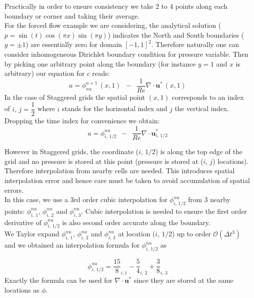 Practically in order to ensure consistency we take 2 to 4 points along each boundary or corner and taking their average. \\

For the forced flow example we are considering, the analytical solution ($p = \sin(t)\cos(\pi x)\sin(\pi y)$) indicates the North and South boundaries ($y=\pm 1$) are essentially zero for domain $[-1,1]^2$. Therefore naturally one can consider inhomogeneous Dirichlet boundary condition for pressure variable. Then by picking one arbitrary point along the boundary (for instance $y=1$ and $x$ is arbitrary) our equation for $c$ reads:
\begin{equation*}
a = \phi^{n+1}_{nu}\,(x,1) \,\,\,-\,\,\, \dfrac{1}{Re} \nabla \cdot \textbf{u}^*\,(x,1)
\end{equation*}
In the case of Staggered grids the spatial point $(x,1)$ corresponds to an index of $i, \, j = \dfrac{1}{2}$ where $i$ stands for the horizontal index and $j$ the vertical index. Dropping the time index for convenience we obtain:
\begin{equation*}
a = \phi^{nu}_{i,\,1/2} \,\,\,-\,\,\, \dfrac{1}{Re} \nabla \cdot \textbf{u}^*_{i,\,1/2}
\end{equation*}

However in Staggered grids, the coordinate ($i,\,1/2$) is along the top edge of the grid and no pressure is stored at this point (pressure is stored at ($i,\,j$) locations). Therefore interpolation from nearby cells are needed. This introduces spatial interpolation error and hence care must be taken to avoid accumulation of spatial errors.\\

In this case, we use a 3rd order cubic interpolation for $\phi^{nu}_{i,\,1/2}$ from 3 nearby points: $\phi^{nu}_{i,\,1}$, $\phi^{nu}_{i,\,2}$ and $\phi^{nu}_{i,\,3}$. Cubic interpolation is needed to ensure the first order derivative of $\phi^{nu}_{i,\,1/2}$ is also second order accurate along the boundary.\\
We Taylor expand $\phi^{nu}_{i,\,1}$, $\phi^{nu}_{i,\,2}$ and $\phi^{nu}_{i,\,3}$ at location ($i,\,1/2$) up to order $\mathcal{O}(\Delta t^3)$ and we obtained an interpolation formula for $\phi^{nu}_{i,\,1/2}$ as

\begin{equation}
\phi^{nu}_{i,\,1/2} = \dfrac{15}{8}_{i,1} - \dfrac{5}{4}_{i,\,2}+\dfrac{3}{8}_{i,\,3}
\end{equation}
Exactly the formula can be used for $\nabla \cdot \textbf{u}^*$ since they are stored at the same locations as $\phi$.\\

